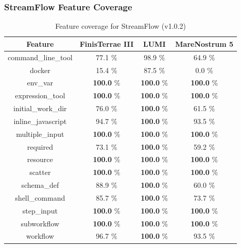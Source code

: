 \documentclass{article}
\begin{document}
\subsubsection*{StreamFlow Feature Coverage}
\begin{table}[ht!]
\centering
\setlength{\tabcolsep}{6pt}
\renewcommand{\arraystretch}{1.2}
\begin{tabular}{|c|c|c|c|}
\hline
\rowcolor{lightgray!50}
\textbf{Feature} & \textbf{FinisTerrae III} & \textbf{LUMI} & \textbf{MareNostrum 5} \\
\hline
command\_line\_tool & 77.1 \% & 98.9 \% & 64.9 \% \\
docker & 15.4 \% & 87.5 \% & 0.0 \% \\
env\_var & \textbf{100.0} \% & \textbf{100.0} \% & \textbf{100.0} \% \\
expression\_tool & \textbf{100.0} \% & \textbf{100.0} \% & \textbf{100.0} \% \\
initial\_work\_dir & 76.0 \% & \textbf{100.0} \% & 61.5 \% \\
inline\_javascript & 94.7 \% & \textbf{100.0} \% & 93.5 \% \\
multiple\_input & \textbf{100.0} \% & \textbf{100.0} \% & \textbf{100.0} \% \\
required & 73.1 \% & \textbf{100.0} \% & 59.2 \% \\
resource & \textbf{100.0} \% & \textbf{100.0} \% & \textbf{100.0} \% \\
scatter & \textbf{100.0} \% & \textbf{100.0} \% & \textbf{100.0} \% \\
schema\_def & 88.9 \% & \textbf{100.0} \% & 60.0 \% \\
shell\_command & 85.7 \% & \textbf{100.0} \% & 73.7 \% \\
step\_input & \textbf{100.0} \% & \textbf{100.0} \% & \textbf{100.0} \% \\
subworkflow & \textbf{100.0} \% & \textbf{100.0} \% & \textbf{100.0} \% \\
workflow & 96.7 \% & \textbf{100.0} \% & 93.5 \% \\
\hline
\end{tabular}
\caption{Feature coverage for StreamFlow (v1.0.2)}
\label{tab:streamflow_feat_v10}
\end{table}
\end{document}
